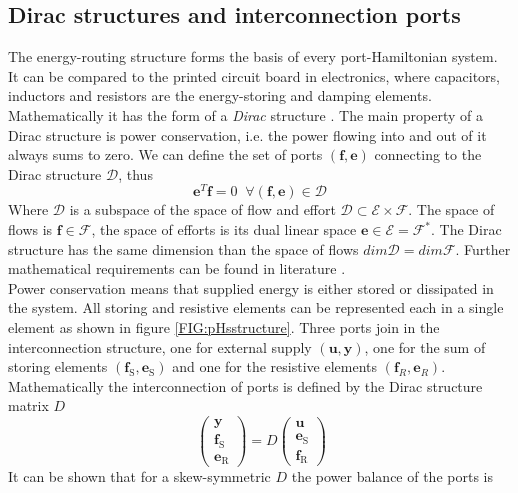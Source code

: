 \documentclass[a4paper,twoside, openright,12pt]{report}
\newcommand{\f}[1]{\boldsymbol{#1}}
\newcommand{\g}[1]{\text{#1}}
\begin{document}
{\subsection{Dirac structures and interconnection ports} \label{SS:PHSinterconnection}
The energy-routing structure forms the basis of every port-Hamiltonian system. It can be compared to the printed circuit board in electronics, where capacitors, inductors and resistors are the energy-storing and damping elements. Mathematically it has the form of a \emph{Dirac} structure \cite{vanderSchaft_06}. The main property of a Dirac structure is power conservation, i.e. the power flowing into and out of it always sums to zero. We can define the set of ports $(\f{f},\f{e})$ connecting to the Dirac structure $\mathcal{D}$, thus 
\begin{equation}
\f{e}^T\f{f} = 0 \;  \; \forall (\f{f},\f{e})\in\mathcal{D}
\end{equation}
Where $\mathcal{D}$ is a subspace of the space of flow and effort $\mathcal{D} \subset \mathcal{E}\times \mathcal{F}$. The space of flows is $\f{f} \in \mathcal{F}$, the space of efforts is its dual linear space $\f{e} \in \mathcal{E} = \mathcal{F}^*$. The Dirac structure has the same dimension than the space of flows $dim \mathcal{D} = dim \mathcal{F}$.
Further mathematical requirements can be found in literature \cite{vanderSchaft_06,Schaft_14}.\\
 Power conservation means that supplied energy is either stored or dissipated in the system. All storing and resistive elements can be represented each in a single element as shown in figure \ref{FIG:pHsstructure}. Three ports join in the interconnection structure, one for external supply $(\f{u},\f{y})$, one for the sum of storing elements $(\f{f}_\g{S},\f{e}_\g{S})$ and one for the resistive elements $(\f{f}_R,\f{e}_R)$. Mathematically the  interconnection of ports is defined by the Dirac structure matrix $D$
\begin{equation}\
\begin{pmatrix}
\f{y} \\ \f{f}_\g{S} \\ \f{e}_\g{R}
\end{pmatrix} = D \begin{pmatrix}
\f{u} \\ \f{e}_\g{S} \\ \f{f}_\g{R}
\end{pmatrix}
\end{equation}
It can be shown that for a skew-symmetric $D$ the power balance of the ports is
}
\end{document}
